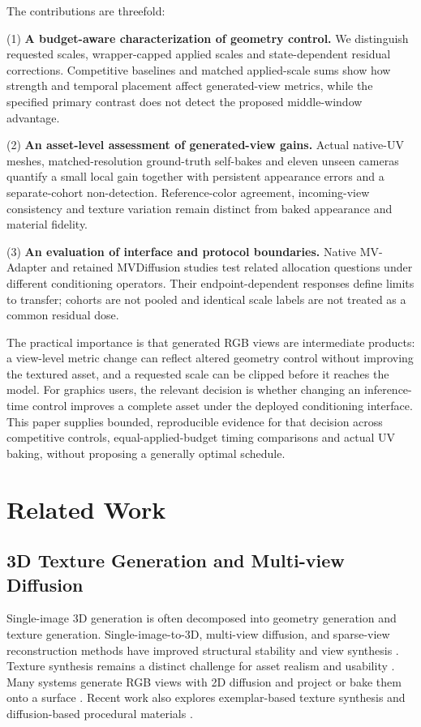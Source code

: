 \documentclass[times,twocolumn,final]{elsarticle}
\begin{document}
The contributions are threefold:

(1) \textbf{A budget-aware characterization of geometry control.} We distinguish requested scales, wrapper-capped applied scales and state-dependent residual corrections. Competitive baselines and matched applied-scale sums show how strength and temporal placement affect generated-view metrics, while the specified primary contrast does not detect the proposed middle-window advantage.

(2) \textbf{An asset-level assessment of generated-view gains.} Actual native-UV meshes, matched-resolution ground-truth self-bakes and eleven unseen cameras quantify a small local gain together with persistent appearance errors and a separate-cohort non-detection. Reference-color agreement, incoming-view consistency and texture variation remain distinct from baked appearance and material fidelity.

(3) \textbf{An evaluation of interface and protocol boundaries.} Native MV-Adapter and retained MVDiffusion studies test related allocation questions under different conditioning operators. Their endpoint-dependent responses define limits to transfer; cohorts are not pooled and identical scale labels are not treated as a common residual dose.

The practical importance is that generated RGB views are intermediate products: a view-level metric change can reflect altered geometry control without improving the textured asset, and a requested scale can be clipped before it reaches the model. For graphics users, the relevant decision is whether changing an inference-time control improves a complete asset under the deployed conditioning interface. This paper supplies bounded, reproducible evidence for that decision across competitive controls, equal-applied-budget timing comparisons and actual UV baking, without proposing a generally optimal schedule.

\section{Related Work}
\label{sec:related}

\subsection{3D Texture Generation and Multi-view Diffusion}
\label{subsec:3dtex}

Single-image 3D generation is often decomposed into geometry generation and texture generation. Single-image-to-3D, multi-view diffusion, and sparse-view reconstruction methods have improved structural stability and view synthesis \cite{liu2023zero1to3,shi2023zero123pp,liu2023syncdreamer,long2023wonder3d,shi2024mvdream,wang2023imagedream,xu2024instantmesh,ke2024era3d}. Texture synthesis remains a distinct challenge for asset realism and usability \cite{perla2026survey}. Many systems generate RGB views with 2D diffusion and project or bake them onto a surface \cite{chen2023text2tex,richardson2023texture,poole2023dreamfusion,chen2023fantasia3d}. Recent work also explores exemplar-based texture synthesis and diffusion-based procedural materials \cite{guzman2026adaptive,lv2025interpretable}.
\end{document}
